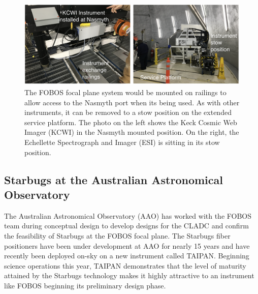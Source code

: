 \documentclass[oneside,11pt]{amsart}
\begin{document}
\begin{figure}[h!]
 \vskip -0.1in
 \includegraphics[width=\textwidth]{figs/Keck_instrument_exchange.png}
 \caption{\small The FOBOS focal plane system would be mounted on railings to allow access to the Nasmyth port when its being used.  As with other instruments, it can be removed to a stow position on the extended service platform.  The photo on the left shows the Keck Cosmic Web Imager (KCWI) in the Nasmyth mounted position.  On the right, the Echellette Spectrograph and Imager (ESI) is sitting in its stow position. }\label{fig:keck_exchange}
\end{figure}

\subsection{Starbugs at the Australian Astronomical Observatory} %
\label{sec:AAO}

The Australian Astronomical Observatory (AAO) has worked with the FOBOS team during conceptual design to develop
designs for the CLADC and confirm the feasibility of Starbugs at the FOBOS focal plane.  The Starbugs fiber
positioners have been under development at AAO for nearly 15 years \citep[see][]{staszak16} and have recently been
deployed on-sky on a new instrument called TAIPAN.  Beginning science operations this year, TAIPAN
demonstrates that the level of maturity attained by the Starbugs technology makes it highly attractive to an instrument
like FOBOS beginning its preliminary design phase.
\end{document}
